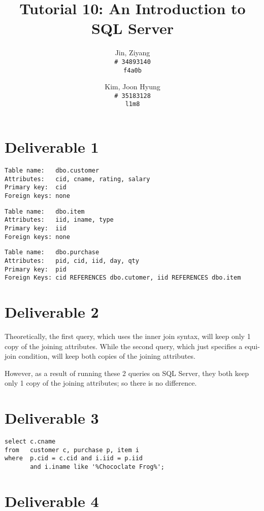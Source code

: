 \documentclass{article}
\title{Tutorial 10: An Introduction to SQL Server}
\author{
	Jin, Ziyang\\
	\texttt{\# 34893140}\\
	\texttt{f4a0b}
	\and
	Kim, Joon Hyung\\
	\texttt{\# 35183128}\\
	\texttt{l1m8}
}
\begin{document}
	\maketitle

\section{Deliverable 1}

\begin{verbatim}
Table name:   dbo.customer
Attributes:   cid, cname, rating, salary
Primary key:  cid
Foreign keys: none
\end{verbatim}

\begin{verbatim}
Table name:   dbo.item
Attributes:   iid, iname, type
Primary key:  iid
Foreign keys: none
\end{verbatim}

\begin{verbatim}
Table name:   dbo.purchase
Attributes:   pid, cid, iid, day, qty
Primary key:  pid
Foreign Keys: cid REFERENCES dbo.cutomer, iid REFERENCES dbo.item
\end{verbatim}





\section{Deliverable 2}

Theoretically, the first query, which uses the inner join syntax, will keep only 1 
copy of the joining attributes. While the second query, which just specifies a equi-
join condition, will keep both copies of the joining attributes. 

However, as a result of running these 2 queries on SQL Server, they both keep only 1
 copy of the joining attributes; so there is no difference.

\section{Deliverable 3}

\begin{verbatim}
select c.cname
from   customer c, purchase p, item i
where  p.cid = c.cid and i.iid = p.iid 
       and i.iname like '%Chococlate Frog%';
\end{verbatim}

\section{Deliverable 4}
\end{document}
